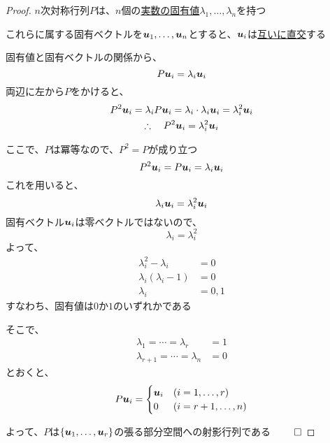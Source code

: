 \documentclass[../../../topic_linear-algebra]{subfiles}
\begin{document}
\begin{proof}
  $n$次対称行列$P$は、$n$個の\hyperref[thm:eigenvalues-of-hermitian-are-real]{実数の固有値}$\lambda_1,\ldots,\lambda_n$を持つ

  これらに属する固有ベクトルを$\vb*{u}_1, \ldots, \vb*{u}_n$とすると、$\vb*{u}_i$は\hyperref[thm:hermitian-eigenvectors-orthogonality]{互いに直交}する

  \br

  固有値と固有ベクトルの関係から、
  \begin{equation*}
    P\vb*{u}_i = \lambda_i \vb*{u}_i
  \end{equation*}
  両辺に左から$P$をかけると、
  \begin{gather*}
    P^2\vb*{u}_i = \lambda_i P\vb*{u}_i = \lambda_i \cdot \lambda_i \vb*{u}_i = \lambda_i^2 \vb*{u}_i \\
    \therefore \quad P^2\vb*{u}_i = \lambda_i^2 \vb*{u}_i
  \end{gather*}

  \br

  ここで、$P$は冪等なので、$P^2 = P$が成り立つ
  \begin{equation*}
    P^2\vb*{u}_i = P\vb*{u}_i = \lambda_i \vb*{u}_i
  \end{equation*}
  これを用いると、
  \begin{equation*}
    \lambda_i \vb*{u}_i = \lambda_i^2 \vb*{u}_i
  \end{equation*}
  固有ベクトル$\vb*{u}_i$は零ベクトルではないので、
  \begin{equation*}
    \lambda_i = \lambda_i^2
  \end{equation*}
  よって、
  \begin{align*}
    \lambda_i^2 - \lambda_i  & = 0     \\
    \lambda_i(\lambda_i - 1) & = 0     \\
    \lambda_i                & = 0 , 1
  \end{align*}
  すなわち、固有値は$0$か$1$のいずれかである

  \br

  そこで、
  \begin{align*}
    \lambda_1 = \cdots = \lambda_r     & = 1 \\
    \lambda_{r+1} = \cdots = \lambda_n & = 0
  \end{align*}
  とおくと、
  \begin{equation*}
    P\vb*{u}_i = \begin{cases}
      \vb*{u}_i & (i = 1,\ldots,r)   \\
      0         & (i = r+1,\ldots,n)
    \end{cases}
  \end{equation*}

  よって、$P$は$\{\vb*{u}_1, \ldots, \vb*{u}_r\}$の張る部分空間への射影行列である $\qed$
\end{proof}
\end{document}
